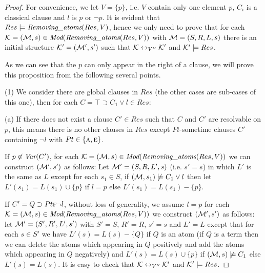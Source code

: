 \documentclass[letterpaper]{article} %
\begin{document}
\begin{proof}
For convenience, we let $V=\{p\}$, i.e. $V$ contain only one element $p$, $C_i$ is a classical clause and $l$ is $p$ or $\neg p$.
It is evident that $Res \models \emph{Removing\_atoms}(Res, V)$, hence we only need to prove that for each ${\cal K}=({\cal M}, s)\in \textit{Mod}(\emph{Removing\_atoms}(Res, V))$ with ${\cal M}=(S, R, L, s)$ there is an initial structure ${\cal K}'=({\cal M}', s')$ such that ${\cal K} \leftrightarrow_{V''} {\cal K}'$ and ${\cal K}' \models Res$. 

As we can see that the $p$ can only appear in the right of a clause, we will prove this proposition from the following several points.

(1) We consider there are global clauses in $Res$ (the other cases are sub-cases of this one), then for each $C=\top\supset C_1 \vee l \in Res$:

(a) If there does not exist a clause $C'\in Res$ such that $C$ and $C'$ are resolvable on $p$, this means there is no other clauses in $Res$ except $Pt$-sometime clauses $C'$ containing $\neg l$ with $Pt\in \{\textsc{a}, \textsc{e}\}$. 

If $p\not \in \textit{Var}(C')$, for each ${\cal K}=({\cal M}, s)\in \textit{Mod}(\emph{Removing\_atoms}(Res, V))$ we can construct $({\cal M}',s')$ as follows: Let ${\cal M}'= (S, R, L',s)$ (i.e. $s'=s$) in which $L'$ is the same as $L$ except for each $s_1\in S$, if $({\cal M}, s_1) \not \models C_1 \vee l$ then let $L'(s_1) = L(s_1) \cup \{p\}$ if $l=p$ else $L'(s_1) = L(s_1) - \{p\}$.

If $C'= Q\supset Pt \textsc{f} \neg l$, without loss of generality, we assume $l=p$  for each ${\cal K}=({\cal M}, s)\in \textit{Mod}(\emph{Removing\_atoms}(Res, V))$ we construct $({\cal M}',s')$ as follows: let ${\cal M}'=(S', R', L', s')$ with $S'=S$, $R'=R$, $s'=s$ and $L'=L$ except that for each $s\in S'$ we have $L'(s) = L(s) - \{Q\}$ if $Q$ is an atom (if $Q$ is a term then we can delete the atoms which appearing in $Q$ positively and add the atoms which appearing in $Q$ negatively) and $L'(s) = L(s) \cup \{p\}$ if $({\cal M}, s) \not \models C_1$ else $L'(s) = L(s)$. 
It is easy to check that ${\cal K} \leftrightarrow_{V''} {\cal K}'$ and ${\cal K}' \models Res$. 


\end{proof}
\end{document}
